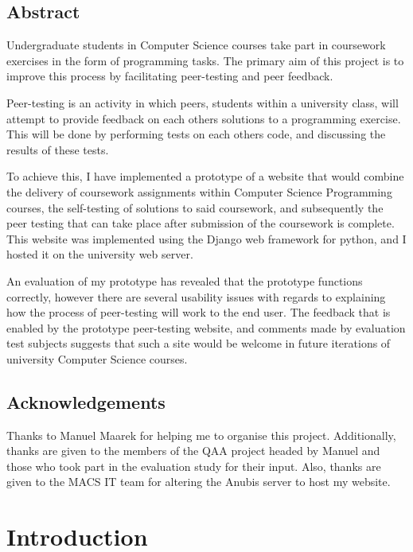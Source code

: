 \documentclass[a4paper,11pt]{report}
\begin{document}
\section*{Abstract}
Undergraduate students in Computer Science courses take part in coursework exercises in the form of programming tasks. The primary aim of this project is to improve this process by facilitating peer-testing and peer feedback.\par
Peer-testing is an activity in which peers, students within a university class, will attempt to provide feedback on each others solutions to a programming exercise. This will be done by performing tests on each others code, and discussing the results of these tests.\par
To achieve this, I have implemented a prototype of a website that would combine the delivery of coursework assignments within Computer Science Programming courses, the self-testing of solutions to said coursework, and subsequently the peer testing that can take place after submission of the coursework is complete. This website was implemented using the Django web framework for python, and I hosted it on the university web server.\par
An evaluation of my prototype has revealed that the prototype functions correctly, however there are several usability issues with regards to explaining how the process of peer-testing will work to the end user. The feedback that is enabled by the prototype peer-testing website, and comments made by evaluation test subjects suggests that such a site would be welcome in future iterations of university Computer Science courses.

\newpage

\section*{Acknowledgements}
Thanks to Manuel Maarek for helping me to organise this project. Additionally, thanks are given to the members of the QAA project headed by Manuel and those who took part in the evaluation study for their input. Also, thanks are given to the MACS IT team for altering the Anubis server to host my website.

\newpage

\pagestyle{headings}


\chapter{Introduction}
\end{document}
